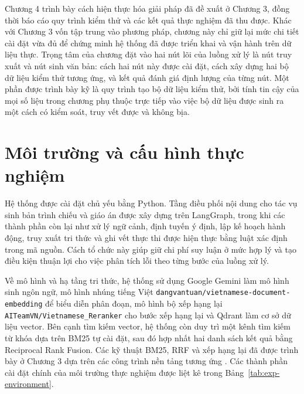 \documentclass[../DoAn.tex]{subfiles}
\begin{document}
Chương 4 trình bày cách hiện thực hóa giải pháp đã đề xuất ở Chương 3, đồng thời báo cáo quy trình kiểm thử và các kết quả thực nghiệm đã thu được. Khác với Chương 3 vốn tập trung vào phương pháp, chương này chỉ giữ lại mức chi tiết cài đặt vừa đủ để chứng minh hệ thống đã được triển khai và vận hành trên dữ liệu thực. Trọng tâm của chương đặt vào hai nút lõi của luồng xử lý là nút truy xuất và nút sinh văn bản: cách hai nút này được cài đặt, cách xây dựng hai bộ dữ liệu kiểm thử tương ứng, và kết quả đánh giá định lượng của từng nút. Một phần được trình bày kỹ là quy trình tạo bộ dữ liệu kiểm thử, bởi tính tin cậy của mọi số liệu trong chương phụ thuộc trực tiếp vào việc bộ dữ liệu được sinh ra một cách có kiểm soát, truy vết được và không bịa.

\section{Môi trường và cấu hình thực nghiệm}

Hệ thống được cài đặt chủ yếu bằng Python. Tầng điều phối nội dung cho tác vụ sinh bản trình chiếu và giáo án được xây dựng trên LangGraph, trong khi các thành phần còn lại như xử lý ngữ cảnh, định tuyến ý định, lập kế hoạch hành động, truy xuất tri thức và ghi vết thực thi được hiện thực bằng luật xác định trong mã nguồn. Cách tổ chức này giúp giữ chi phí suy luận ở mức hợp lý và tạo điều kiện thuận lợi cho việc phân tích lỗi theo từng bước của luồng xử lý.

Về mô hình và hạ tầng tri thức, hệ thống sử dụng Google Gemini làm mô hình sinh ngôn ngữ, mô hình nhúng tiếng Việt \texttt{dangvantuan/vietnamese-document-embedding} để biểu diễn phân đoạn, mô hình bộ xếp hạng lại \texttt{AITeamVN/Vietnamese\_Reranker} cho bước xếp hạng lại và Qdrant làm cơ sở dữ liệu vector. Bên cạnh tìm kiếm vector, hệ thống còn duy trì một kênh tìm kiếm từ khóa dựa trên BM25 tự cài đặt, sau đó hợp nhất hai danh sách kết quả bằng Reciprocal Rank Fusion. Các kỹ thuật BM25, RRF và xếp hạng lại đã được trình bày ở Chương 3 dựa trên các công trình nền tảng tương ứng \cite{robertson2009bm25,cormack2009rrf,nogueira2019passage}. Các thành phần cài đặt chính của môi trường thực nghiệm được liệt kê trong Bảng~\ref{tab:exp-environment}.
\end{document}
